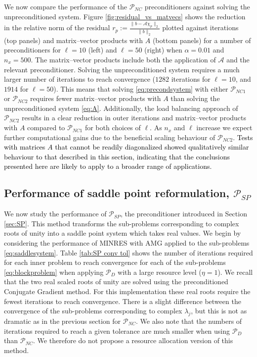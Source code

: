 \documentclass{article}
\newcommand{\jt}{\textcolor{black}}%
\newcommand{\resource}{\eta}
\theoremstyle{definition}
\begin{document}
{		We now compare the performance of the $\mathcal{P}_{NC}$ preconditioners against solving the unpreconditioned system.
		Figure \ref{fig:residual_vs_matvecs} shows the reduction in the relative norm of the residual $r_p := \frac{\|b-\mathcal{A}\chi_p\|_2}{\|b\|_2}$ plotted against iterations (top panels) and matrix--vector products with $A$ (bottom panels) for a number of preconditioners for $\ell=10$ (left) and $\ell=50$ (right) when $\alpha=0.01$ and $n_x=500$. The matrix--vector products include both the application of $\mathcal{A}$ and the relevant preconditioner.   Solving the unpreconditioned system requires a much larger number of iterations to reach convergence ($1282$ iterations for $\ell=10$, and $1914$ for $\ell=50$). This means that solving \eqref{eq:precondsystem} with either $\mathcal{P}_{NC1}$ or $\mathcal{P}_{NC2}$ requires fewer matrix--vector products with $A$ than solving the unpreconditioned system \eqref{eq:A}. Additionally, the load balancing approach of $\mathcal{P}_{NC2}$ results in a clear reduction in outer iterations and matrix--vector products with $A$ compared to $\mathcal{P}_{NC1}$ for both choices of $\ell$. As $n_x$ and $\ell$ increase we expect further computational gains due to the beneficial scaling behaviour of $\mathcal{P}_{NC2}$. \jt{Tests with matrices $A$ that cannot be readily diagonalized showed qualitatively similar behaviour to that described in this section, indicating that the conclusions presented here are likely to apply to a broader range of applications. }
		
		\subsection{Performance of saddle point reformulation, $\mathcal{P}_{SP}$}
		We now study the performance of $\mathcal{P}_{SP}$, the preconditioner introduced in Section \ref{sec:SP}. This method transforms the sub-problems corresponding to complex roots of unity  into a saddle point system which takes real values. We begin by considering the performance of MINRES with AMG applied to the sub-problems \eqref{eq:saddlesystem}. Table \ref{tab:SP conv tol} shows the number of iterations required for each inner problem to reach convergence for each of the sub-problems \eqref{eq:blockproblem} when applying $\mathcal{P}_{D}$ with a large resource level ($\resource=1$). We recall that the two real scaled roots of unity are solved using the preconditioned Conjugate Gradient method. For this implementation these real roots require the fewest iterations to reach convergence.  There is a slight difference between the convergence of the sub-problems corresponding to complex $\lambda_j$, but this is not as dramatic as in the previous section for $\mathcal{P}_{NC}$. We also note that the numbers of iterations required to reach a given tolerance are much smaller when using $\mathcal{P}_{D}$ than $\mathcal{P}_{NC}$. We therefore do not propose a resource allocation version of this method. 
		
}
\end{document}
